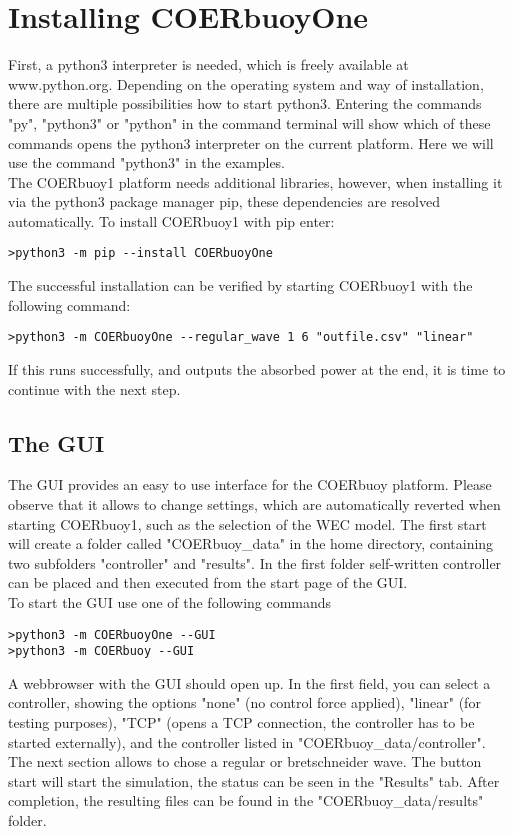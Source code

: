 \documentclass[oneside,10pt,a4paper]{book}
\begin{document}
\section{Installing COERbuoyOne}
First, a python3 interpreter is needed, which is freely available at www.python.org. Depending on the operating system and way of installation, there are multiple possibilities how to start python3. Entering the commands "py", "python3" or "python" in the command terminal will show which of these commands opens the python3 interpreter on the current platform. Here we will use the command "python3" in the examples.\\
The COERbuoy1 platform needs additional libraries, however, when installing it via the python3 package manager pip, these dependencies are resolved automatically. To install COERbuoy1 with pip enter:
\begin{verbatim}
>python3 -m pip --install COERbuoyOne
\end{verbatim}
The successful installation can be verified by starting COERbuoy1 with the following command:
\begin{verbatim}
>python3 -m COERbuoyOne --regular_wave 1 6 "outfile.csv" "linear"
\end{verbatim}
If this runs successfully, and outputs the absorbed power at the end, it is time to continue with the next step.
\subsection{The GUI}
The GUI provides an easy to use interface for the COERbuoy platform. Please observe that it allows to change settings, which are automatically reverted when starting COERbuoy1, such as the selection of the WEC model. The first start will create a folder called "COERbuoy\_data" in the home directory, containing two subfolders "controller" and "results". In  the first folder self-written controller can be placed and then executed from the start page of the GUI.\\
To start the GUI use one of the following commands
\begin{verbatim}
>python3 -m COERbuoyOne --GUI
>python3 -m COERbuoy --GUI
\end{verbatim}
A webbrowser with the GUI should open up. In the first field, you can select a controller, showing the options "none" (no control force applied), "linear" (for testing purposes), "TCP" (opens a TCP connection, the controller has to be started externally), and the controller listed in "COERbuoy\_data/controller".\\
The next section allows to chose a regular or bretschneider wave. The button start will start the simulation, the status can be seen in the "Results" tab. After completion, the resulting files can be found in the "COERbuoy\_data/results" folder.
\end{document}
